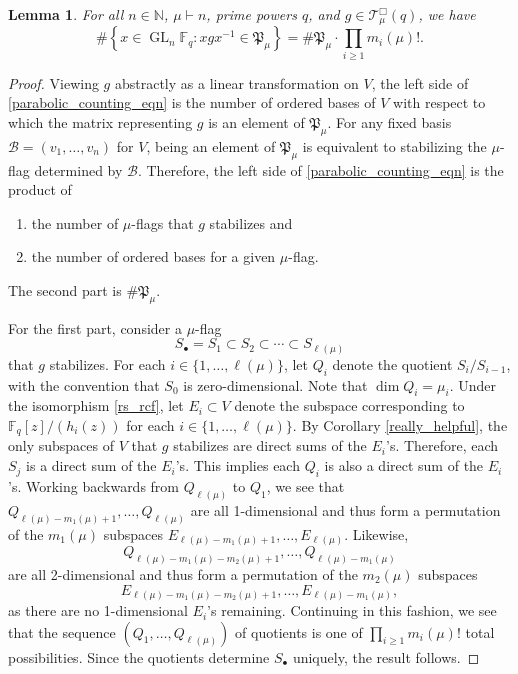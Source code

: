 \documentclass[10pt]{article}
\newtheorem{lemma}[theorem]{Lemma}
\theoremstyle{definition}
\DeclareMathOperator{\GL}{GL}
\newcommand{\CB}{\mathcal{B}}
\newcommand{\F}{\mathbb{F}}
\newcommand{\N}{\mathbb{N}}
\newcommand{\CT}{\mathcal{T}}
\newcommand{\para}{\mathfrak{P}}
\begin{document}
\begin{lemma}
\label{parabolic_counting_lemma}
For all \(n \in \N\), $\mu \vdash n$, prime powers \(q\), and $g \in \CT_\mu^\Box (q)$, we have
\begin{equation} \label{parabolic_counting_eqn} \# \left \{ x \in \GL_n \F_q : xgx^{-1} \in \para_\mu \right \} = \# \para_\mu \cdot \prod_{i \geq 1} m_i(\mu)! .\end{equation}
\end{lemma}
\begin{proof}
Viewing \(g\) abstractly as a linear transformation on \(V\), the left side of \eqref{parabolic_counting_eqn} is the number of ordered bases of $V$ with respect to which the matrix representing $g$ is an element of $\para_\mu$.
For any fixed basis $\CB = (v_1,\ldots,v_{n})$ for $V$, being an element of $\para_\mu$ is equivalent to stabilizing the $\mu$-flag determined by $\CB$.
Therefore, the left side of \eqref{parabolic_counting_eqn} is the product of
\begin{enumerate}[(1)]
\item the number of $\mu$-flags that $g$ stabilizes and
\item the number of ordered bases for a given $\mu$-flag.
\end{enumerate}
The second part is $\# \para_\mu$.

For the first part, consider a $\mu$-flag
$$ S_\bullet = S_1 \subset S_2 \subset \cdots \subset S_{\ell(\mu)}$$
that $g$ stabilizes.
For each \(i \in \{1,\ldots,\ell(\mu)\}\), let \(Q_i\) denote the quotient \(S_i / S_{i-1}\), with the convention that \(S_0\) is zero-dimensional.
Note that \(\dim Q_i = \mu_i\).
Under the isomorphism \eqref{rs_rcf}, let \(E_i \subset V\) denote the subspace corresponding to \(\F_q[z] / (h_i(z))\) for each \(i \in \{1,\ldots,\ell(\mu)\}\).
By Corollary \ref{really_helpful}, the only subspaces of $V$ that $g$ stabilizes are direct sums of the $E_i$'s.
Therefore, each $S_j$ is a direct sum of the $E_i$'s.
This implies each $Q_i$ is also a direct sum of the $E_i$'s.
Working backwards from \(Q_{\ell(\mu)}\) to \(Q_1\), we see that
\(
Q_{\ell(\mu)-m_1(\mu)+1},
\ldots,
Q_{\ell(\mu)}
\) are all 1-dimensional
and thus form a permutation of the \(m_1(\mu)\) subspaces
\(
E_{\ell(\mu)-m_1(\mu)+1},
\ldots,
E_{\ell(\mu)}
\).
Likewise,
\[
Q_{\ell(\mu)-m_1(\mu)-m_2(\mu)+1},
\ldots,
Q_{\ell(\mu)-m_1(\mu)}
\]
are all 2-dimensional and thus form a permutation of the \(m_2(\mu)\) subspaces
\[
E_{\ell(\mu)-m_1(\mu)-m_2(\mu)+1},
\ldots,
E_{\ell(\mu)-m_1(\mu)},
\]
as there are no 1-dimensional \(E_i\)'s remaining.
Continuing in this fashion, we see that the sequence \((Q_1,\ldots,Q_{\ell(\mu)})\) of quotients is one of \(\prod_{i \geq 1} m_i(\mu)!\) total possibilities.
Since the quotients determine \(S_\bullet\) uniquely, the result follows.
\end{proof}
\end{document}
